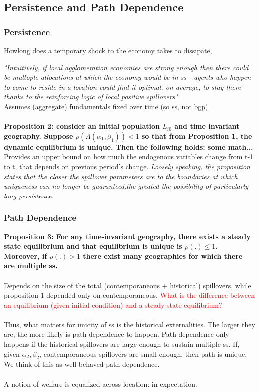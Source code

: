 \documentclass[12pt, final]{article}
\begin{document}
\subsection{Persistence and Path Dependence} %

\subsubsection{Persistence}
Howlong does a temporary shock to the economy takes to dissipate,

\textit{"Intuitively, if local agglomeration economies are strong enough then there could be multople allocations at which the economy would be in ss - agents who happen to come to reside in a location could find it optimal, on average, to stay there thanks to the reinforcing logic of local positive spillovers".}
\\
Assumes (aggregate) fundamentals fixed over time (so ss, not bgp). \\
\\
\textbf{Proposition 2: consider an initial population $L_{i0}$ and time invariant geography. Suppose $\rho(A(\alpha_1, \beta_1)) < 1$ so that from Proposition 1, the dynamic equilibrium is unique. Then the following holds: some math...} Provides an upper bound on how much the endogenous variables change from t-1 to t, that depends on previous period's change. \textit{Loosely speaking, the proposition states that the closer the spillover parameters are to the boundaries at which uniqueness can no longer be guaranteed,the greated the possibility of particularly long persistence.}


\subsubsection{Path Dependence}

\textbf{Proposition 3: For any time-invariant geography, there exists a steady state equilibrium and that equilibrium is unique is $\rho(.) \leq 1$. Moreover, if $\rho(.) > 1$ there exist many geographies for which there are multiple ss.}
\\
\\
Depends on the size of the total (contemporaneous + historical) spillovers, while proposition 1 depended only on contemporaneous. \textcolor{red}{What is the difference between an equilibrium (given initial condition) and a steady-state equilibrium?}
\\
\\
Thus, what matters for unicity of ss is the historical externalities. The larger they are, the more likely is path dependence to happen. Path dependence only happens if the historical spillovers are large enough to sustain multiple ss. If, given $\alpha_2, \beta_2$, contemporaneous spillovers are small enough, then path is unique. We think of this as well-behaved path dependence.
\\
\\ 
A notion of welfare is equalized across location: in expectation.
\\
\\
\end{document}
